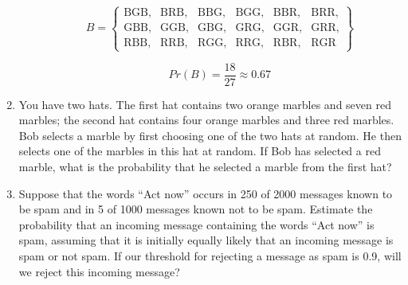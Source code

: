 \documentclass[11pt, letterpaper, includehead]{article}
\theoremstyle{plain}
\theoremstyle{mydefinition}
\theoremstyle{myproperty}
\begin{document}
\begin{enumerate}[label=\textbf{\arabic*}., leftmargin=*]
\begin{enumerate}[label=(\alph*)]
    \[
    B = \left\{
    \begin{array}{llllll}
    \text{BGB}, & \text{BRB}, & \text{BBG}, & \text{BGG}, & \text{BBR}, & \text{BRR}, \\ 
    \text{GBB}, & \text{GGB}, & \text{GBG}, & \text{GRG}, & \text{GGR}, & \text{GRR}, \\
    \text{RBB}, & \text{RRB}, & \text{RGG}, & \text{RRG}, & \text{RBR}, & \text{RGR}
    \end{array}
    \right\}
    \]

    \[Pr(B) = \frac{18}{27} \approx 0.67\]
\end{enumerate}

\item You have two hats. The first hat contains two orange marbles and seven red marbles; the second hat contains four orange marbles and three red marbles. Bob selects a marble by first choosing one of the two hats at random. He then selects one of the marbles in this hat at random. If Bob has selected a red marble, what is the probability that he selected a marble from the first hat?

\item  Suppose that the words ``Act now'' occurs in 250 of 2000 messages known to be spam and in 5 of 1000 messages known not to be spam. Estimate the probability that an incoming message containing the words ``Act now'' is spam, assuming that it is initially equally likely that an incoming message is spam or not spam. If our threshold for rejecting a message as spam is 0.9, will we reject this incoming message?

\end{enumerate}
\end{document}
